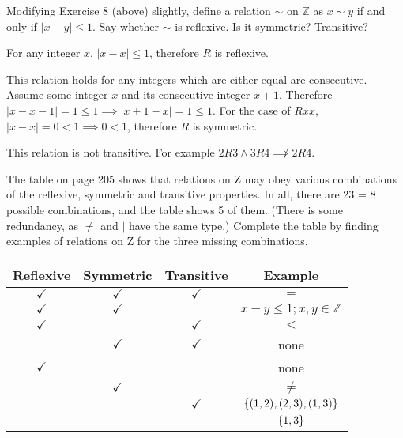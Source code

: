 \documentclass{article}
\begin{document}
\begin{exercise}{}{}{Modifying Exercise 8 (above) slightly, define a relation
		$\sim$ on $\mathbb{Z}$ as $x \sim y$ if and only if $|x-y| \leq 1$. Say
		whether $\sim$ is reflexive. Is it symmetric? Transitive?}
	\tcblower
	\begin{alist}
		\item For any integer $x$, $|x-x| \leq 1$, therefore $R$ is reflexive.
		\item This relation holds for any integers which are either equal are
		consecutive. Assume some integer $x$ and its consecutive integer $x+1$.
		Therefore $|x-x-1|=1\leq 1 \implies |x+1-x|=1 \leq 1$.
		For the case of $Rxx$, $|x-x|=0 < 1 \implies 0 < 1$, therefore $R$ is symmetric.
		\item This relation is not transitive. For example $2R3 \land 3R4 \not\implies
			2R4$.
	\end{alist}
\end{exercise}{}{}

\begin{exercise}{}{}
	The table on page 205 shows that relations on Z may obey
	various combinations of the reflexive, symmetric and transitive
	properties. In all, there are 23 = 8 possible combinations, and the
	table shows 5 of them. (There is some redundancy, as $\neq$ and $\mid$
	have the same type.) Complete the table by finding examples of relations
	on Z for the three missing combinations.
	\tcblower
	\begin{tabular}{|c|c|c|c|}
		\hline
		\textbf{Reflexive}  & \textbf{Symmetric} & \textbf{Transitive} & \textbf{Example}              \\
		\hline $\checkmark$ & $\checkmark$       & $\checkmark$        & $=$                           \\
		\hline $\checkmark$ & $\checkmark$       &                     & $x-y\leq 1; x,y\in\mathbb{Z}$ \\
		\hline $\checkmark$ &                    & $\checkmark$        & $\leq$                        \\
		\hline              & $\checkmark$       & $\checkmark$        & none                          \\
		\hline $\checkmark$ &                    &                     & none                          \\
		\hline              & $\checkmark$       &                     & $\neq$                        \\
		\hline              &                    & $\checkmark$        & $\{(1,2), (2, 3), (1, 3)\}$ \\
		\hline              &                    &                     & $\{1,3\}$                   \\
		\hline
	\end{tabular}
\end{exercise}{}{}
\end{document}
